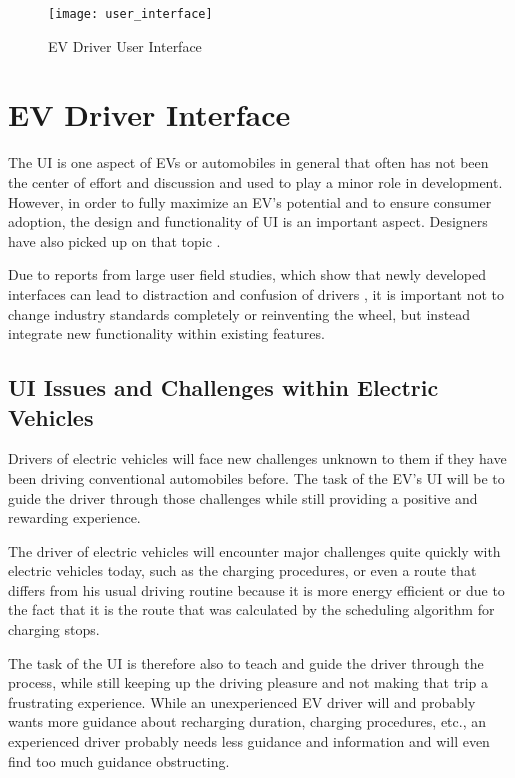 \clearpage

\begin{figure*}[ht]
\centering
\texttt{[image: user\_interface]}
\caption{EV Driver User Interface}
\end{figure*}

\section{EV Driver Interface}

The UI is one aspect of EVs or automobiles in general that often has not been the center of effort and discussion and used to play a minor role in development. However, in order to fully maximize an EV's potential and to ensure consumer adoption, the design and functionality of UI is an important aspect. Designers have also picked up on that topic \cite{driver-1}.

Due to reports from large user field studies, which show that newly developed interfaces can lead to distraction and confusion of drivers \cite{driver-2} \cite{driver-3}, it is important not to change industry standards completely or reinventing the wheel, but instead integrate new functionality within existing features. 

\subsection{UI Issues and Challenges within Electric Vehicles}

Drivers of electric vehicles will face new challenges unknown to them if they have been driving conventional automobiles before. The task of the EV's UI will be to guide the driver through those challenges while still providing a positive and rewarding experience.

The driver of electric vehicles will encounter major challenges quite quickly with electric vehicles today, such as the charging procedures, or even a route that differs from his usual driving routine because it is more energy efficient or due to the fact that it is the route that was calculated by the scheduling algorithm for charging stops.

The task of the UI is therefore also to teach and guide the driver through the process, while still keeping up the driving pleasure and not making that trip a frustrating experience. While an unexperienced EV driver will and probably wants more guidance about recharging duration, charging procedures, etc., an experienced driver probably needs less guidance and information and will even find too much guidance obstructing.

